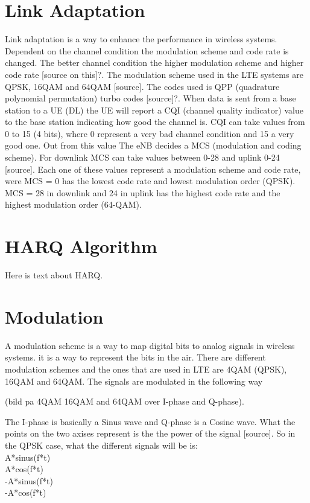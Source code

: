 \documentclass[cropmarks, frame, english]{idamasterthesis}
\begin{document}
\section{Link Adaptation}
Link adaptation is a way to enhance the performance in wireless systems. Dependent on the channel condition the modulation scheme and code rate is changed. The better channel condition the higher modulation scheme and higher code rate [source on this]?. The modulation scheme used in the LTE systems are QPSK, 16QAM and 64QAM [source]. The codes used is QPP (quadrature polynomial permutation) turbo codes [source]?. When data is sent from a base station to a UE (DL) the UE will report a CQI (channel quality indicator) value to the base station indicating how good the channel is. CQI can take values from 0 to 15 (4 bits), where 0 represent a very bad channel condition and 15 a very good one. Out from this value The eNB decides a MCS (modulation and coding scheme). For downlink MCS can take values between 0-28 and uplink 0-24 [source]. Each one of these values represent a modulation scheme and code rate, were MCS = 0 has the lowest code rate and lowest modulation order (QPSK). MCS = 28 in downlink and 24 in uplink has the highest code rate and the highest modulation order (64-QAM).

\section{HARQ Algorithm}
Here is text about HARQ.

\section{Modulation}
A modulation scheme is a way to map digital bits to analog signals in wireless systems. it is a way to represent the bits in the air.
There are different modulation schemes and the ones that are used in LTE are 4QAM (QPSK), 16QAM and 64QAM. The signals are modulated in the following way 

(bild pa 4QAM 16QAM and 64QAM over I-phase and Q-phase). 
 
The I-phase is basically a Sinus wave and Q-phase is a Cosine wave. What the points on the two axises represent is the the power of the signal [source]. So in the QPSK case, what the different signals will be is:\\
 A*sinus(f*t)\\
 A*cos(f*t)\\
 -A*sinus(f*t) \\  
 -A*cos(f*t)\\
 
\end{document}
